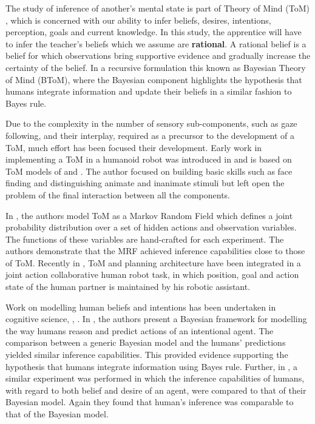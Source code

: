 The study of inference of another's mental state is part of Theory of Mind (ToM) \cite{Towards_a_ToM_2010}, which is concerned 
with our ability to infer beliefs, desires, intentions, perception,
goals and current knowledge. In this study, the apprentice will have to infer the teacher's beliefs which we assume are 
\textbf{rational}. A rational belief is a belief for which observations bring supportive evidence and 
gradually increase the certainty of the belief. In a recursive formulation this known as Bayesian Theory of Mind (BToM),
where the Bayesian component highlights the hypothesis that humans integrate information and update their beliefs in a similar 
fashion to Bayes rule.

Due to the complexity in the number of sensory sub-components, such as gaze following, and their interplay, required as a precursor to the development
of a ToM, much effort has been focused their  development.
Early work in implementing a ToM in a humanoid robot was introduced in \cite{ToM_humanoid} and is based on ToM models of \cite{Leslie_TOMM} 
and \cite{Baron-Cohen}. The author focused on building basic skills such as face finding and distinguishing animate and inanimate 
stimuli but left open the problem of the final interaction between all the components.

In \cite{MRF_ToM}, the authors model ToM as a Markov Random Field which defines a joint probability distribution over a set of
hidden actions and observation variables. The functions of these variables are hand-crafted for each experiment. 
The authors demonstrate that the MRF achieved inference capabilities close to those of ToM.
Recently in \cite{ToM_HRI_2106}, ToM and planning architecture have been integrated in a joint action collaborative human robot task, 
in which position, goal and action state of the human partner is maintained by his robotic assistant.

Work on modelling human beliefs and intentions has been undertaken in cognitive science, \cite{Bake_Saxe_Tene_2011}, 
\cite{Richardson1_Baker1_Tenenbaum1_Saxe1_2012}. In \cite{Bake_Tene_Saxe_2006}, the authors present a Bayesian framework 
for modelling the way humans reason and predict actions of an intentional agent. The comparison between 
a generic Bayesian model and the humans' predictions yielded similar inference capabilities.
This provided evidence supporting the hypothesis that humans integrate information using Bayes rule. 
Further, in \cite{Bake_Saxe_Tene_2011}, a similar experiment was performed in which the inference capabilities of humans,
with regard to both belief and desire of an agent, were compared to that of their Bayesian model. Again they found
that human's inference was comparable to that of the Bayesian model.

